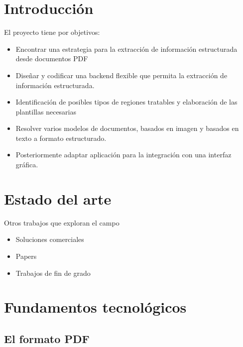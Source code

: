 
\chapter{Introducción}
\label{chap:introduccion}

El proyecto tiene por objetivos:
\begin{itemize}
    \item Encontrar una estrategia para la extracción de información estructurada desde documentos PDF 
    \item Diseñar y codificar una backend flexible que permita la extracción de información estructurada.
    \item Identificación de posibles tipos de regiones tratables y elaboración de las plantillas necesarias
    \item Resolver varios modelos de documentos, basados en imagen y basados en texto a formato estructurado.
    \item Posteriormente adaptar aplicación para la integración con una interfaz gráfica.
\end{itemize}


\chapter{Estado del arte}
\label{chap:estado-arte}

Otros trabajos que exploran el campo
\begin{itemize}
    \item Soluciones comerciales
    \item Papers
    \item Trabajos de fin de grado
\end{itemize}


\chapter{Fundamentos tecnológicos}
\label{chap:fundamentos-tecnologicos}

\section{El formato PDF}

